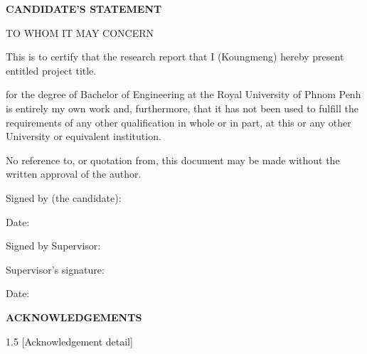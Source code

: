 \documentclass[12pt,a4paper]{report}
\begin{document}
\newpage
{}
{}
\vspace*{0\baselineskip}
\begin{center}
    \textbf{CANDIDATE'S STATEMENT}
\end{center}
\vspace*{1.5\baselineskip}
\noindent
TO WHOM IT MAY CONCERN

\vspace*{2\baselineskip}

\noindent
\begin{minipage}{\textwidth}
    \noindent
    This is to certify that the research report that I (Koungmeng) hereby present entitled project title. \par
    \noindent

    \vspace*{2\baselineskip}
    for the degree of Bachelor of Engineering at the Royal University of Phnom Penh is entirely my own work and, furthermore, that it has not been used to fulfill the requirements of any other qualification in whole or in part, at this or any other University or equivalent institution. \par
    \vspace*{1\baselineskip}
    No reference to, or quotation from, this document may be made without the written approval of the author.\par
    \vspace*{2\baselineskip}
    Signed by (the candidate): {\dotfill} \par
    \vspace*{1\baselineskip}
    Date: {\dotfill} \par
    \vspace*{2\baselineskip}
    Signed by Supervisor: {\dotfill} \par
    \vspace*{1\baselineskip}
    Supervisor's signature: {\dotfill} \par
    \vspace*{1\baselineskip}
    Date: {\dotfill} \par
\end{minipage}

\newpage
{}
{}
\vspace*{0\baselineskip}
\begin{center}
    \textbf{ACKNOWLEDGEMENTS}
\end{center}
\vspace*{1.5\baselineskip}
\begin{spacing}{1.5}
    [Acknowledgement detail]
\end{spacing}
\end{document}
